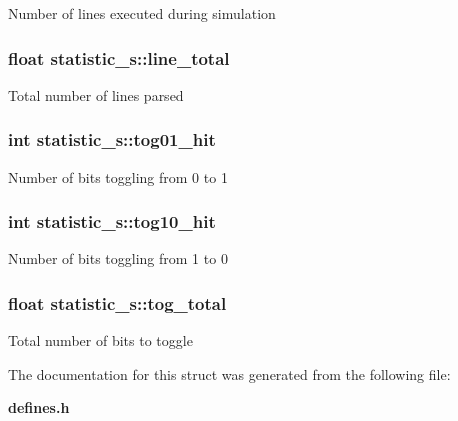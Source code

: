 Number of lines executed during simulation 
\subsubsection{\setlength{\rightskip}{0pt plus 5cm}float {\bf statistic\_\-s::line\_\-total}}\label{structstatistic__s_o0}


Total number of lines parsed 
\subsubsection{\setlength{\rightskip}{0pt plus 5cm}int {\bf statistic\_\-s::tog01\_\-hit}}\label{structstatistic__s_o3}


Number of bits toggling from 0 to 1 
\subsubsection{\setlength{\rightskip}{0pt plus 5cm}int {\bf statistic\_\-s::tog10\_\-hit}}\label{structstatistic__s_o4}


Number of bits toggling from 1 to 0 
\subsubsection{\setlength{\rightskip}{0pt plus 5cm}float {\bf statistic\_\-s::tog\_\-total}}\label{structstatistic__s_o2}


Total number of bits to toggle 

The documentation for this struct was generated from the following file:\begin{CompactItemize}
\item 
{\bf defines.h}\end{CompactItemize}
